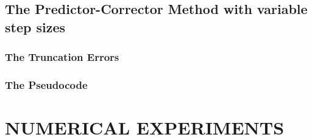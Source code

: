 \documentclass[12pt,oneside]{book}
\begin{document}
	\section{The Predictor-Corrector Method with variable step sizes} \label{m:abpcvs}
		\begin{spacing}{1.2}
			
			
			
			\subsection*{The Truncation Errors}
			
			
			\subsection{The Pseudocode}
			
		\end{spacing}
		






	\chapter{NUMERICAL EXPERIMENTS}
	
	
	

	\backmatter
	
	\renewcommand{\bibname}{REFERENCES}
	
	
\end{document}

